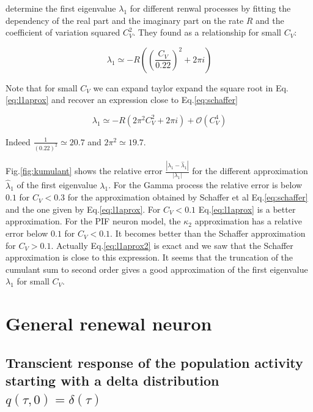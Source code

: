 \documentclass[12pt,twoside]{report}
\begin{document}
\cite{SchOst13} determine the first eigenvalue $\lambda_1$ for different renwal processes by fitting the dependency of the real part and the imaginary part on the rate $R$ and the coefficient of variation squared $C_V^2$. They found as a relationship for small $C_V$:

\begin{equation}
\label{eq:schaffer}
\lambda_1 \simeq -R\left( \left(\frac{C_V}{0.22}\right)^2+2\pi i\right) 
\end{equation}

Note that for small $C_V$ we can expand taylor expand the square root in Eq.\eqref{eq:l1aprox} and recover an expression close to Eq.\eqref{eq:schaffer}

\begin{equation}
\label{eq:l1aprox2}
\lambda_1\simeq -R\left(2\pi^2 C_V^2+2\pi i\right) + \mathcal{O}(C_V^4)
\end{equation}

Indeed $\frac{1}{(0.22)^2}\simeq20.7$ and $2\pi^2\simeq19.7$.

Fig.\ref{fig:kumulant} shows the relative error $\frac{|\lambda_1 -\hat{\lambda}_1|}{|\lambda_1|}$ for the different approximation $\hat{\lambda}_1$ of the first eigenvalue $\lambda_1$. For the Gamma process the relative error is below $0.1$ for $C_V<0.3$ for the approximation obtained by Schaffer et al Eq.\eqref{eq:schaffer} and the one given by Eq.\eqref{eq:l1aprox}. For $C_V<0.1$ Eq.\eqref{eq:l1aprox} is a better approximation. For
the PIF neuron model, the $\kappa_2$ approximation has a relative error below $0.1$ for $C_V<0.1$. It becomes better than the Schaffer approximation for $C_V>0.1$. Actually Eq.\eqref{eq:l1aprox2} is exact and we saw that the Schaffer approximation is close to this expression. It seems that the truncation of the cumulant sum to second order gives a good approximation of the first eigenvalue $\lambda_1$ for small $C_V$.







\chapter{General renewal neuron}
\label{chap:grene}

\section{Transcient response of the population activity starting with a delta distribution $q(\tau,0)=\delta(\tau)$}
\end{document}
